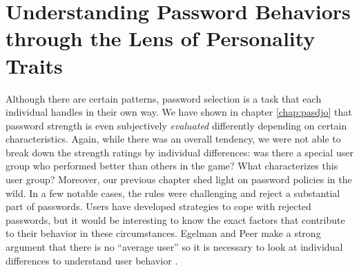 \chapter[Password Personality]{Understanding Password Behaviors through the Lens of Personality Traits}\label{chap:pws_and_personality}

Although there are certain patterns, password selection is a task that each individual handles in their own way. 
We have shown in chapter \ref{chap:pasdjo} that password strength is even subjectively \textit{evaluated} differently depending on certain characteristics. Again, while there was an overall tendency, we were not able to break down the strength ratings by individual differences: was there a special user group who performed better than others in the game? What characterizes this user group? Moreover, our previous chapter shed light on password policies in the wild. In a few notable cases, the rules were challenging and reject a substantial part of passwords. Users have developed strategies to cope with rejected passwords, but it would be interesting to know the exact factors that contribute to their behavior in these circumstances. Egelman and Peer make a strong argument that there is no ``average user'' so it is necessary to look at individual differences to understand user behavior \cite{Egelman2015AverageUser}. 

